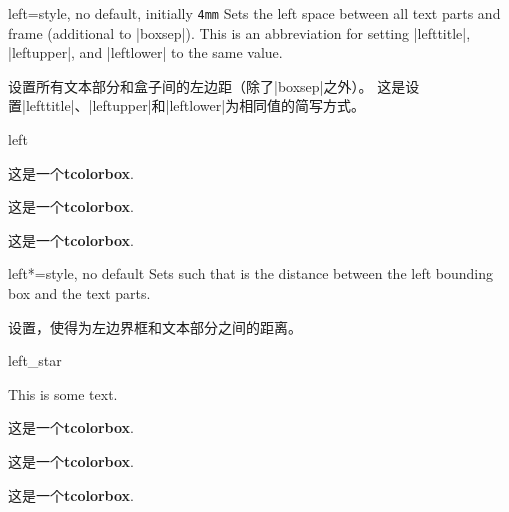\begin{docTcbKey}{left}{=}{style, no default, initially \texttt{4mm}}
Sets the left space between all text parts and frame (additional to |boxsep|).
This is an abbreviation for setting
|lefttitle|, |leftupper|, and |leftlower| to the same value.

设置所有文本部分和盒子间的左边距（除了|boxsep|之外）。 这是设置|lefttitle|、|leftupper|和|leftlower|为相同值的简写方式。

\begin{exdispExample}{left}

\begin{tcolorbox}
  这是一个\textbf{tcolorbox}.
  \end{tcolorbox}

\begin{tcolorbox}[left=0mm]
这是一个\textbf{tcolorbox}.
\end{tcolorbox}

\begin{tcolorbox}[left=10mm]
这是一个\textbf{tcolorbox}.
\end{tcolorbox}
\end{exdispExample}
\end{docTcbKey}

\begin{docTcbKey}[][doc new=2017-02-16]{left*}{=}{style, no default}
Sets  such that  is the distance between
the left bounding box and the text parts.

设置，使得为左边界框和文本部分之间的距离。


\begin{exdispExample}{left_star}

This is some text.
\begin{tcolorbox}[grow to left by=5mm,left*=0mm,
enhanced,show bounding box]
这是一个\textbf{tcolorbox}.
\end{tcolorbox}

\begin{tcolorbox}[left*=0mm,
enhanced,show bounding box]
这是一个\textbf{tcolorbox}.
\end{tcolorbox}

\begin{tcolorbox}
这是一个\textbf{tcolorbox}.
\end{tcolorbox}
\end{exdispExample}
\end{docTcbKey}

